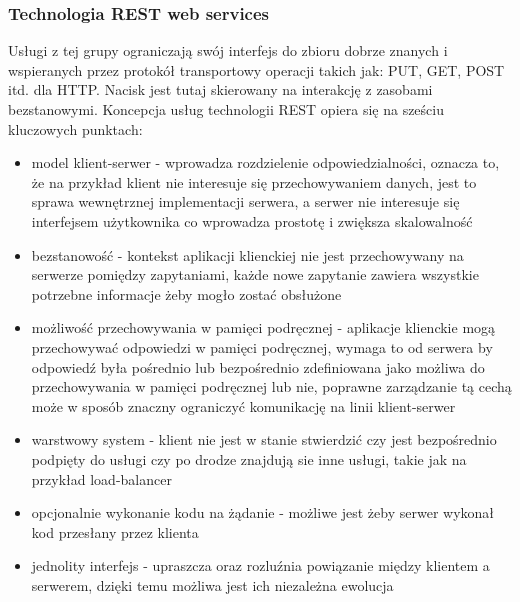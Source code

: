 \subsubsection{Technologia REST web services}
Usługi z tej grupy \cite{fielding2000} ograniczają swój interfejs do zbioru dobrze znanych i wspieranych przez protokół transportowy operacji takich jak: PUT, GET, POST itd. dla  HTTP. Nacisk jest tutaj skierowany na interakcję z zasobami bezstanowymi. Koncepcja usług technologii REST opiera się na sześciu kluczowych punktach:
\begin{itemize}
	\item model klient-serwer - wprowadza rozdzielenie odpowiedzialności, oznacza to, że na przykład klient nie interesuje się przechowywaniem danych, jest to sprawa wewnętrznej implementacji serwera, a serwer nie interesuje się interfejsem użytkownika co wprowadza prostotę i zwiększa skalowalność
	\item bezstanowość - kontekst aplikacji klienckiej nie jest przechowywany na serwerze pomiędzy zapytaniami, każde nowe zapytanie zawiera wszystkie potrzebne informacje żeby mogło zostać obsłużone
	\item możliwość przechowywania w pamięci podręcznej - aplikacje klienckie mogą przechowywać odpowiedzi w pamięci podręcznej, wymaga to od serwera by odpowiedź była pośrednio lub bezpośrednio zdefiniowana jako możliwa do przechowywania w pamięci podręcznej lub nie, poprawne zarządzanie tą cechą może w sposób znaczny ograniczyć komunikację na linii klient-serwer
	\item warstwowy system - klient nie jest w stanie stwierdzić czy jest bezpośrednio podpięty do usługi czy po drodze znajdują sie inne usługi, takie jak na przykład load-balancer
	\item opcjonalnie wykonanie kodu na żądanie - możliwe jest żeby serwer wykonał kod przesłany przez klienta
	\item jednolity interfejs - upraszcza oraz rozluźnia powiązanie między klientem a serwerem, dzięki temu możliwa jest ich niezależna ewolucja
\end{itemize}   
